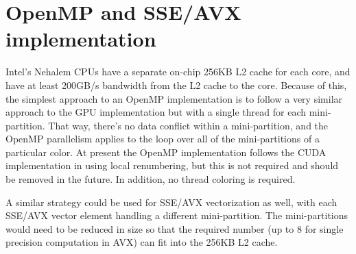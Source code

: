 \documentclass[12pt]{article}
\begin{document}
%
%
%
%
%



\newpage

\section{OpenMP and SSE/AVX implementation}


Intel's Nehalem CPUs have a separate on-chip 256KB L2 cache for each
core, and have at least 200GB/s bandwidth from the L2 cache to the core.
Because of this, the simplest approach to an OpenMP implementation is
to follow a very similar approach to the GPU implementation but with a
single thread for each mini-partition. That way, there's no data conflict
within a mini-partition, and the OpenMP parallelism applies to the loop
over all of the mini-partitions of a particular color.
At present the OpenMP implementation follows the CUDA implementation in
using local renumbering, but this is not required and should be removed
in the future.  In addition, no thread coloring is required.

A similar strategy could be used for SSE/AVX vectorization as well,
with each SSE/AVX vector element handling a different mini-partition.
The mini-partitions would need to be reduced in size so that the
required number (up to 8 for single precision computation in AVX)
can fit into the 256KB L2 cache.
\end{document}
